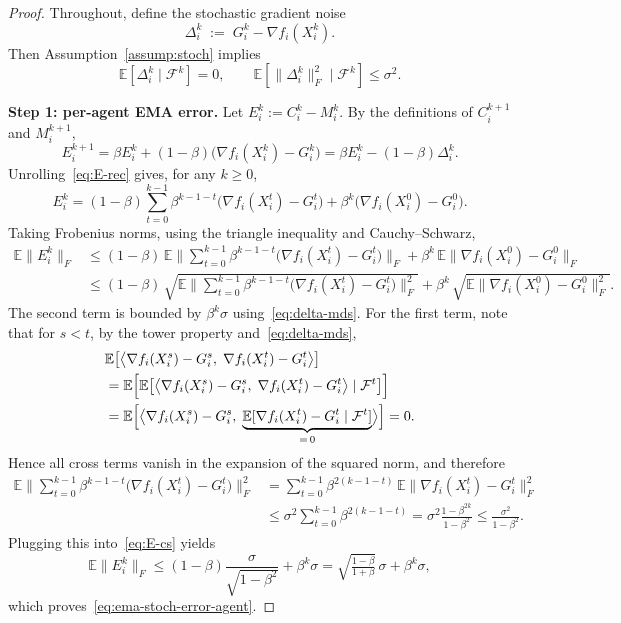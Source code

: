 \documentclass{article}
\begin{document}
\begin{proof}
Throughout, define the stochastic gradient noise
\[
    \Delta_i^k\;:=\;G_i^k-\nabla f_i(X_i^k).
\]
Then Assumption~\ref{assump:stoch} implies
\begin{equation}
\label{eq:delta-mds}
\mathbb{E}[\Delta_i^k\mid \mathcal{F}^k]=0,\qquad
\mathbb{E}[\|\Delta_i^k\|_F^2\mid \mathcal{F}^k]\le \sigma^2.
\end{equation}

\medskip\noindent\textbf{Step 1: per-agent EMA error.}
Let $E_i^k:=C_i^k-M_i^k$.
By the definitions of $C_i^{k+1}$ and $M_i^{k+1}$,
\begin{equation}
\label{eq:E-rec}
E_i^{k+1}=\beta E_i^k + (1-\beta)\bigl(\nabla f_i(X_i^k)-G_i^k\bigr)
=\beta E_i^k-(1-\beta)\Delta_i^k.
\end{equation}
Unrolling~\eqref{eq:E-rec} gives, for any $k\ge 0$,
\begin{equation}
\label{eq:E-unroll}
E_i^k
=(1-\beta)\sum_{t=0}^{k-1}\beta^{k-1-t}\bigl(\nabla f_i(X_i^t)-G_i^t\bigr)
+\beta^k\bigl(\nabla f_i(X_i^0)-G_i^0\bigr).
\end{equation}
Taking Frobenius norms, using the triangle inequality and Cauchy--Schwarz,
\begin{align}
\mathbb{E}\|E_i^k\|_F
&\le (1-\beta)\,\mathbb{E}\Big\|\sum_{t=0}^{k-1}\beta^{k-1-t}\bigl(\nabla f_i(X_i^t)-G_i^t\bigr)\Big\|_F
+\beta^k\,\mathbb{E}\|\nabla f_i(X_i^0)-G_i^0\|_F\nonumber\\
&\le (1-\beta)\,\sqrt{\mathbb{E}\Big\|\sum_{t=0}^{k-1}\beta^{k-1-t}\bigl(\nabla f_i(X_i^t)-G_i^t\bigr)\Big\|_F^2}
+\beta^k\,\sqrt{\mathbb{E}\|\nabla f_i(X_i^0)-G_i^0\|_F^2}.
\label{eq:E-cs}
\end{align}
The second term is bounded by $\beta^k\sigma$ using~\eqref{eq:delta-mds}.
For the first term, note that for $s<t$, by the tower property and~\eqref{eq:delta-mds},
\begin{align*}
&\mathbb{E}\bigl[\bigl\langle \nabla f_i(X_i^s)-G_i^s,\;
  \nabla f_i(X_i^t)-G_i^t\bigr\rangle\bigr]\\
&=\mathbb{E}\Bigl[\mathbb{E}\bigl[\bigl\langle \nabla f_i(X_i^s)-G_i^s,\;
  \nabla f_i(X_i^t)-G_i^t\bigr\rangle\mid\mathcal{F}^t\bigr]\Bigr]\\
&=\mathbb{E}\Bigl[\bigl\langle \nabla f_i(X_i^s)-G_i^s,\;
  \underbrace{\mathbb{E}[\nabla f_i(X_i^t)-G_i^t\mid\mathcal{F}^t]}_{=\,0}\bigr\rangle\Bigr]
=0.
\end{align*}
Hence all cross terms vanish in the expansion of the squared norm, and therefore
\begin{align*}
\mathbb{E}\Big\|\sum_{t=0}^{k-1}\beta^{k-1-t}\bigl(\nabla f_i(X_i^t)-G_i^t\bigr)\Big\|_F^2
&=\sum_{t=0}^{k-1}\beta^{2(k-1-t)}\,\mathbb{E}\|\nabla f_i(X_i^t)-G_i^t\|_F^2 \\
&\le \sigma^2\sum_{t=0}^{k-1}\beta^{2(k-1-t)}
=\sigma^2\frac{1-\beta^{2k}}{1-\beta^2}
\le \frac{\sigma^2}{1-\beta^2}.
\end{align*}
Plugging this into~\eqref{eq:E-cs} yields
\[
\mathbb{E}\|E_i^k\|_F
\le (1-\beta)\frac{\sigma}{\sqrt{1-\beta^2}}+\beta^k\sigma
=\sqrt{\tfrac{1-\beta}{1+\beta}}\,\sigma+\beta^k\sigma,
\]
which proves~\eqref{eq:ema-stoch-error-agent}.


\end{proof}
\end{document}
